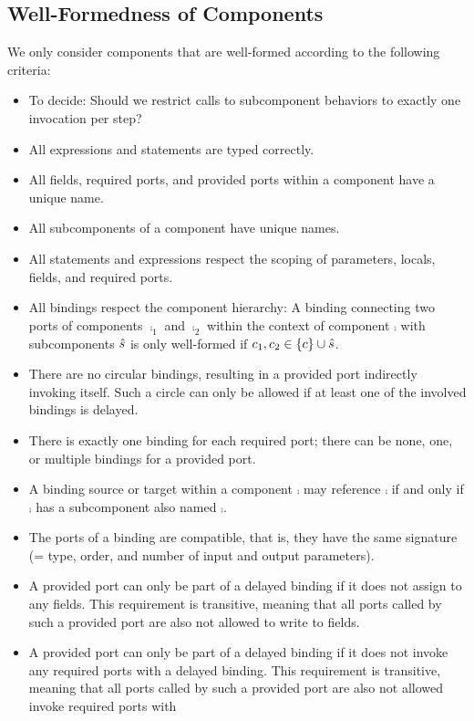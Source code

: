 \documentclass[a4paper,10pt,english]{article}
\begin{document}
\subsection{Well-Formedness of Components}
We only consider components that are well-formed according to the following criteria:
\begin{itemize}
	\item To decide: Should we restrict calls to subcomponent behaviors to exactly one invocation per step?
	\item All expressions and statements are typed correctly.
	\item All fields, required ports, and provided ports within a component have a unique name.
	\item All subcomponents of a component have unique names.
	\item All statements and expressions respect the scoping of parameters, locals, fields, and required ports.
	\item All bindings respect the component hierarchy: A binding connecting two ports of components $\comp_1$ and $\comp_2$ within
	the context of component $\comp$ with subcomponents $\hat{s}$ is only well-formed if $c_1, c_2 \in \{ c \} \cup
	\hat{s}$.
	\item There are no circular bindings, resulting in a provided port indirectly invoking itself. Such a circle can only be allowed
	if at least one of the involved bindings is delayed.
	\item There is exactly one binding for each required port; there can be none, one, or multiple bindings for a provided port.
	\item A binding source or target within a component $\comp$ may reference $\comp$ if and only if $\comp$ has a subcomponent also
	named $\comp$.
	\item The ports of a binding are compatible, that is, they have the same signature (= type, order, and number of input and
	output parameters).
	\item A provided port can only be part of a delayed binding if it does not assign to any fields. This requirement is transitive,
	meaning that all ports called by such a provided port are also not allowed to write to fields.
	\item A provided port can only be part of a delayed binding if it does not invoke any required ports with a delayed binding. This
	requirement is transitive, meaning that all ports called by such a provided port are also not allowed invoke required ports with

\end{itemize}
\end{document}

